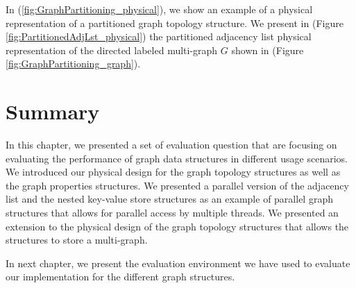 {In (\ref{fig:GraphPartitioning_physical}), we show an example of a physical representation of a partitioned graph topology structure. We present in (Figure \ref{fig:PartitionedAdjLst_physical}) the partitioned adjacency list physical representation of the directed labeled multi-graph $G$ shown in (Figure \ref{fig:GraphPartitioning_graph}).




\section{Summary}
\label{sec:PhyDesign-Summary}

In this chapter, we presented a set of evaluation question that are focusing on evaluating the performance of graph data structures in different usage scenarios. We introduced our physical design for the graph topology structures as well as the graph properties structures. We presented a parallel version of the adjacency list and the nested key-value store structures as an example of parallel graph structures that allows for parallel access by multiple threads. We presented an extension to the physical design of the graph topology structures that allows the structures to store a multi-graph.

In next chapter, we present the evaluation environment we have used to evaluate our implementation for the different graph structures.


}